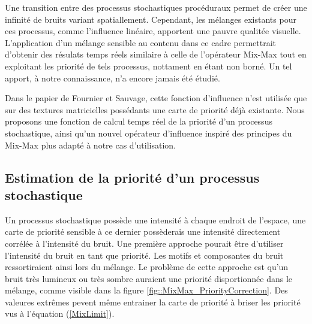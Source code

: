 \documentclass[9pt, twocolumn]{article} %
\begin{document}
Une transition entre des processus stochastiques procéduraux permet de créer
une infinité de bruits variant spatiallement. Cependant, les mélanges existants
pour ces processus, comme l'influence linéaire, apportent une pauvre qualitée
visuelle. L'application d'un mélange sensible au contenu dans ce cadre
permettrait d'obtenir des résulats temps réels similaire à celle de l'opérateur
Mix-Max tout en exploitant les priorité de tels processus, nottament en étant
non borné. Un tel apport, à notre connaissance, n'a encore jamais été étudié.

Dans le papier de Fournier et Sauvage, cette fonction d'influence n'est
utilisée que sur des textures matricielles possédants une carte de priorité
déjà existante. Nous proposons une fonction de calcul temps réel de la priorité
d'un processus stochastique, ainsi qu'un nouvel opérateur d'influence inspiré
des principes du Mix-Max plus adapté à notre cas d'utilisation.

\subsection{Estimation de la priorité d'un processus stochastique}

Un processus stochastique possède une intensité à chaque endroit de l'espace,
une carte de priorité sensible à ce dernier possèderais une intensité
directement corrélée à l'intensité du bruit. Une première approche pourait être
d'utiliser l'intensité du bruit en tant que priorité. Les motifs et composantes
du bruit ressortiraient ainsi lors du mélange. Le problème de cette approche
est qu'un bruit très lumineux ou très sombre auraient une priorité
disportionnée dans le mélange, comme visible dans la figure
\ref{fig::MixMax_PriorityCorrection}. Des valeures extrêmes pevent même
entrainer la carte de priorité à briser les priorité vus à l'équation
(\ref{MixLimit}).
\end{document}
